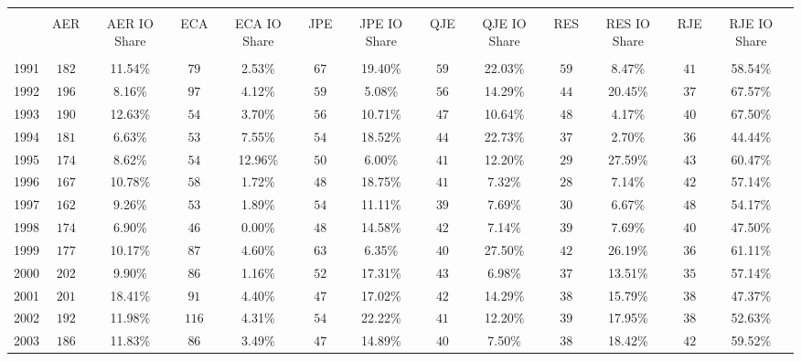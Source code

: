 
\begin{table}[!htbp] \centering 
  \caption{} 
  \label{} 
\footnotesize 
\begin{tabular}{@{\extracolsep{2pt}} ccccccccccccc} 
\\[-1.8ex]\hline 
\hline \\[-1.8ex] 
 & AER & AER IO Share & ECA & ECA IO Share & JPE & JPE IO Share & QJE & QJE IO Share & RES & RES IO Share & RJE & RJE IO Share \\ 
\hline \\[-1.8ex] 
1991 & $182$ & 11.54\% & $79$ & 2.53\% & $67$ & 19.40\% & $59$ & 22.03\% & $59$ & 8.47\% & $41$ & 58.54\% \\ 
1992 & $196$ & 8.16\% & $97$ & 4.12\% & $59$ & 5.08\% & $56$ & 14.29\% & $44$ & 20.45\% & $37$ & 67.57\% \\ 
1993 & $190$ & 12.63\% & $54$ & 3.70\% & $56$ & 10.71\% & $47$ & 10.64\% & $48$ & 4.17\% & $40$ & 67.50\% \\ 
1994 & $181$ & 6.63\% & $53$ & 7.55\% & $54$ & 18.52\% & $44$ & 22.73\% & $37$ & 2.70\% & $36$ & 44.44\% \\ 
1995 & $174$ & 8.62\% & $54$ & 12.96\% & $50$ & 6.00\% & $41$ & 12.20\% & $29$ & 27.59\% & $43$ & 60.47\% \\ 
1996 & $167$ & 10.78\% & $58$ & 1.72\% & $48$ & 18.75\% & $41$ & 7.32\% & $28$ & 7.14\% & $42$ & 57.14\% \\ 
1997 & $162$ & 9.26\% & $53$ & 1.89\% & $54$ & 11.11\% & $39$ & 7.69\% & $30$ & 6.67\% & $48$ & 54.17\% \\ 
1998 & $174$ & 6.90\% & $46$ & 0.00\% & $48$ & 14.58\% & $42$ & 7.14\% & $39$ & 7.69\% & $40$ & 47.50\% \\ 
1999 & $177$ & 10.17\% & $87$ & 4.60\% & $63$ & 6.35\% & $40$ & 27.50\% & $42$ & 26.19\% & $36$ & 61.11\% \\ 
2000 & $202$ & 9.90\% & $86$ & 1.16\% & $52$ & 17.31\% & $43$ & 6.98\% & $37$ & 13.51\% & $35$ & 57.14\% \\ 
2001 & $201$ & 18.41\% & $91$ & 4.40\% & $47$ & 17.02\% & $42$ & 14.29\% & $38$ & 15.79\% & $38$ & 47.37\% \\ 
2002 & $192$ & 11.98\% & $116$ & 4.31\% & $54$ & 22.22\% & $41$ & 12.20\% & $39$ & 17.95\% & $38$ & 52.63\% \\ 
2003 & $186$ & 11.83\% & $86$ & 3.49\% & $47$ & 14.89\% & $40$ & 7.50\% & $38$ & 18.42\% & $42$ & 59.52\% \\ 

\end{tabular}
\end{table}
